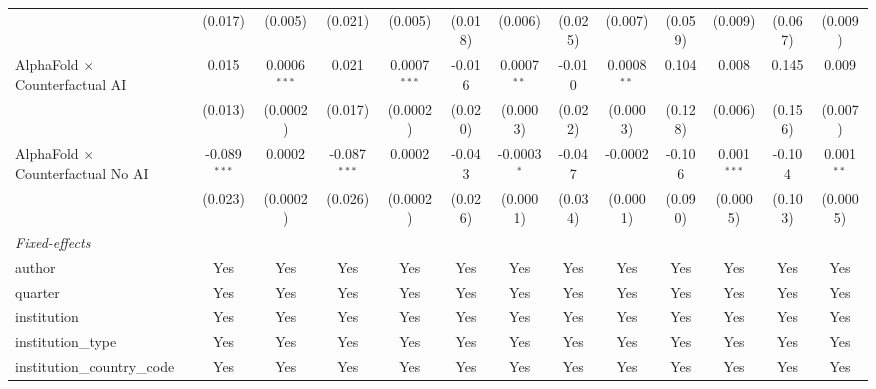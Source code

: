 \begin{tabular}{lcccccccccccc}
                                            & (0.017)        & (0.005)        & (0.021)        & (0.005)        & (0.018)     & (0.006)       & (0.025) & (0.007)        & (0.059)       & (0.009)        & (0.067)       & (0.009)\\   
   AlphaFold $\times$ Counterfactual AI     & 0.015          & 0.0006$^{***}$ & 0.021          & 0.0007$^{***}$ & -0.016      & 0.0007$^{**}$ & -0.010  & 0.0008$^{**}$  & 0.104         & 0.008          & 0.145         & 0.009\\   
                                            & (0.013)        & (0.0002)       & (0.017)        & (0.0002)       & (0.020)     & (0.0003)      & (0.022) & (0.0003)       & (0.128)       & (0.006)        & (0.156)       & (0.007)\\   
   AlphaFold $\times$ Counterfactual No AI  & -0.089$^{***}$ & 0.0002         & -0.087$^{***}$ & 0.0002         & -0.043      & -0.0003$^{*}$ & -0.047  & -0.0002        & -0.106        & 0.001$^{***}$  & -0.104        & 0.001$^{**}$\\   
                                            & (0.023)        & (0.0002)       & (0.026)        & (0.0002)       & (0.026)     & (0.0001)      & (0.034) & (0.0001)       & (0.090)       & (0.0005)       & (0.103)       & (0.0005)\\   
   \midrule
   \emph{Fixed-effects}\\
   author                                   & Yes            & Yes            & Yes            & Yes            & Yes         & Yes           & Yes     & Yes            & Yes           & Yes            & Yes           & Yes\\  
   quarter                                  & Yes            & Yes            & Yes            & Yes            & Yes         & Yes           & Yes     & Yes            & Yes           & Yes            & Yes           & Yes\\  
   institution                              & Yes            & Yes            & Yes            & Yes            & Yes         & Yes           & Yes     & Yes            & Yes           & Yes            & Yes           & Yes\\  
   institution\_type                        & Yes            & Yes            & Yes            & Yes            & Yes         & Yes           & Yes     & Yes            & Yes           & Yes            & Yes           & Yes\\  
   institution\_country\_code               & Yes            & Yes            & Yes            & Yes            & Yes         & Yes           & Yes     & Yes            & Yes           & Yes            & Yes           & Yes\\  

\end{tabular}
